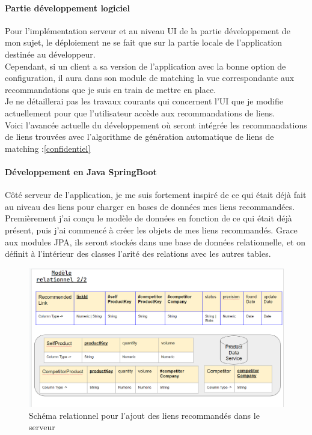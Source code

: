 \documentclass{rapportCS}
\begin{document}
\paragraph{Partie développement logiciel}
Pour l'implémentation serveur et au niveau UI de la partie développement de mon sujet,
le déploiement ne se fait que sur la partie locale de l'application destinée au développeur.\\
Cependant, si un client a sa version de l'application avec la bonne option de configuration,
il aura dans son module de matching la vue correspondante aux recommandations que je suis
en train de mettre en place.\\

Je ne détaillerai pas les travaux courants qui concernent l'UI que je modifie actuellement pour que l'utilisateur
accède aux recommandations de liens.\\

Voici l'avancée actuelle du développement où seront intégrée les recommandations de liens trouvées avec
l'algorithme de génération automatique de liens de matching :\ref{confidentiel} \\

\newpage
\paragraph*{Développement en Java SpringBoot}
Côté serveur de l'application, je me suis fortement inspiré de ce qui était déjà fait
au niveau des liens pour charger en bases de données mes liens recommandées.\\

Premièrement j'ai conçu le modèle de données en fonction de ce qui était déjà présent,
puis j'ai commencé à créer les objets de mes liens recommandés.
Grace aux modules JPA, ils seront stockés dans une base de données relationnelle,
et on définit à l'intérieur des classes l'arité des relations avec les autres tables.\\

\begin{figure}[h!]
  \centerline{\includegraphics[width=20cm]{images/relationnel.PNG}}
  \caption{\label{relationnel} Schéma relationnel pour l'ajout des liens recommandés dans le serveur}
  \end{figure}
\end{document}
